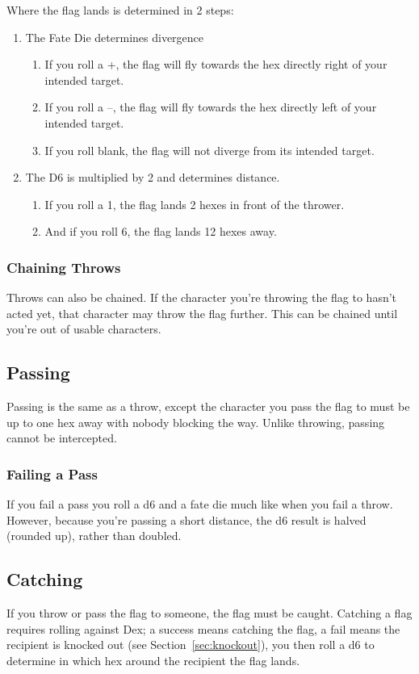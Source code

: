 Where the flag lands is determined in 2 steps:
\begin{enumerate}
    \item The Fate Die determines divergence
    \begin{enumerate}
        \item If you roll a +, the flag will fly towards the hex directly right of your intended target.
        \item If you roll a –, the flag will fly towards the hex directly left of your intended target.
        \item If you roll blank, the flag will not diverge from its intended target.
    \end{enumerate}
    \item The D6 is multiplied by 2 and determines distance.
    \begin{enumerate}
        \item If you roll a 1, the flag lands 2 hexes in front of the thrower.
        \item And if you roll 6, the flag lands 12 hexes away.
    \end{enumerate}
\end{enumerate}

\subsubsection{Chaining Throws}
Throws can also be chained. If the character you're throwing the flag to hasn't acted yet, that character may throw the flag further. This can be chained until you're out of usable characters.
\subsection{Passing}
Passing is the same as a throw, except the character you pass the flag to must be up to one hex away with nobody blocking the way. Unlike throwing, passing cannot be intercepted.
\subsubsection{Failing a Pass}
If you fail a pass you roll a d6 and a fate die much like when you fail a throw.
However, because you’re passing a short distance, the d6 result is halved (rounded up), rather than doubled.
\subsection{Catching}
If you throw or pass the flag to someone, the flag must be caught. Catching a flag requires rolling against Dex; a success means catching the flag, a fail means the recipient is knocked out (see Section~\ref{sec:knockout}), you then roll a d6 to determine in which hex around the recipient the flag lands.

